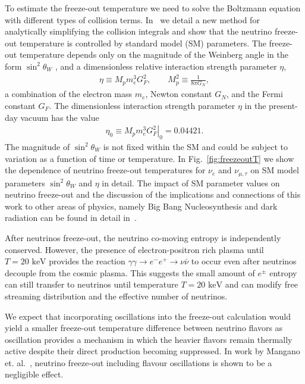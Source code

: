 \documentclass[universe,article,submit,moreauthors,pdftex,a4paper]{Definitions/mdpi}
\newcommand{\keV}{\text{ keV}}
\newcommand*{\rf}[1]{Fig.~{\ref{#1}}}
\begin{document}
 To estimate the freeze-out temperature we need to solve the Boltzmann equation with different types of collision terms. In~\cite{Birrell:2014uka} we detail a new method for analytically simplifying the collision integrals and show that the neutrino freeze-out temperature is controlled by standard model (SM) parameters. The freeze-out temperature depends only on the magnitude of the Weinberg angle in the form $\sin^2\theta_W$ , and a dimensionless relative interaction strength parameter $\eta$,
\begin{align}
\eta\equiv M_p m_e^3 G_F^2, \qquad M_p^2\equiv \frac{1}{8\pi G_N}, \end{align}
a combination of the electron mass $m_e$, Newton constant $G_N$, and the Fermi constant $G_F$. The dimensionless interaction strength parameter $\eta$ in the present-day vacuum has the value
\begin{align}
\eta_0\equiv \left.M_p m_e^3 G_F^2\right|_0 = 0.04421 .
\end{align}
The magnitude of $\sin^2\theta_W$ is not fixed within the SM and could be subject to variation as a function of time or temperature. In \rf{fig:freezeoutT} we show the dependence of neutrino freeze-out temperatures for $\nu_e$ and $\nu_{\mu,\tau}$ on SM model parameters $\sin^2\theta_W$ and $\eta$ in detail. The impact of SM parameter values on neutrino freeze-out and the discussion of the implications and connections of this work to other areas of physics, namely Big Bang Nucleosynthesis and dark radiation can be found in detail in~\cite{Dreiner:2011fp,Boehm:2012gr,Blennow:2012de,Birrell:2014uka}.

After neutrinos freeze-out, the neutrino co-moving entropy is independently conserved. However, the presence of electron-positron rich plasma until $T=20\keV$ provides the reaction $\gamma\gamma\to e^-e^+\to\nu\bar{\nu}$ to occur even after neutrinos decouple from the cosmic plasma. This suggests the small amount of $e^\pm$ entropy can still transfer to neutrinos until temperature $T=20\keV$ and can modify free streaming distribution and the effective number of neutrinos.

We expect that incorporating oscillations into the freeze-out calculation would yield a smaller freeze-out temperature difference between neutrino flavors as oscillation provides a mechanism in which the heavier flavors remain thermally active despite their direct production becoming suppressed. In work by Mangano et. al.~\cite{Mangano:2005cc}, neutrino freeze-out including flavour oscillations is shown to be a negligible effect.
\end{document}
